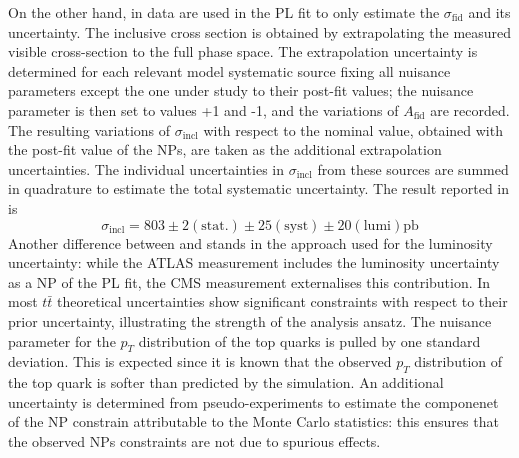 \documentclass[12pt]{article}
\begin{document}
On the other hand, in \cite{CMS_inclusive} data are used in the PL fit to only estimate the $\sigma_{\mathrm{fid}}$ and its uncertainty. The inclusive cross section is obtained by extrapolating the measured visible cross-section to the full phase space. The extrapolation uncertainty is determined for each relevant model systematic source fixing all nuisance parameters except the one under study to their post-fit values; the nuisance parameter is then set to values +1 and -1, and the variations of $A_{\mathrm{fid}}$ are recorded. The resulting variations of $\sigma_{\mathrm{incl}}$ with respect to the nominal value, obtained with the post-fit value of the NPs, are taken as the additional extrapolation uncertainties. The individual uncertainties in $\sigma_{\mathrm{incl}}$ from these sources are summed in quadrature to estimate the total systematic uncertainty. The result reported in \cite{CMS_inclusive} is
\begin{equation}
\sigma_{\mathrm{incl}} = 803\pm2(\mathrm{stat.})\pm25(\mathrm{syst})\pm20(\mathrm{lumi})\mathrm{pb}
\end{equation}
Another difference between \cite{Aad_2020} and \cite{CMS_inclusive} stands in the approach used for the luminosity uncertainty: while the ATLAS measurement includes the luminosity uncertainty as a NP of the PL fit, the CMS measurement externalises this contribution.
In \cite{CMS_inclusive} most $t\bar{t}$ theoretical uncertainties show significant constraints with respect to their prior uncertainty, illustrating the strength of the analysis ansatz. The nuisance parameter for the $p_T$ distribution of the top quarks is pulled by one standard deviation. This is expected since it is known that the observed $p_T$ distribution of the top quark is softer than predicted by the simulation. An additional uncertainty is determined from pseudo-experiments to estimate the componenet of the NP constrain attributable to the Monte Carlo statistics: this ensures that the observed NPs constraints are not due to spurious effects.
\end{document}
